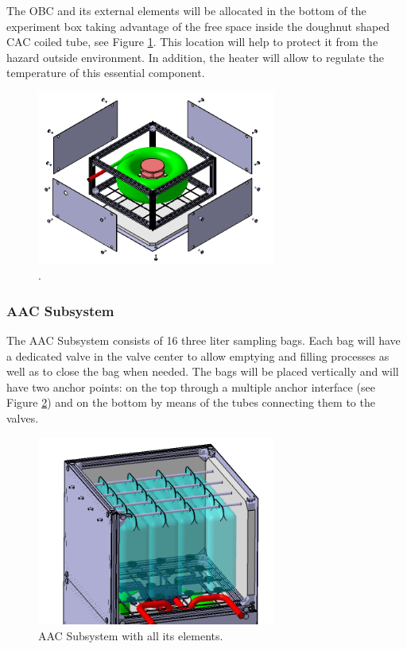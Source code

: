 The OBC and its external elements will be allocated in the bottom of the experiment box taking advantage of the free space inside the doughnut shaped CAC coiled tube, see Figure \ref{electronics_box}. This location will help to protect it from the hazard outside environment. In addition, the heater will allow to regulate the temperature of this essential component.


\begin{figure}[!ht]
    \centering
    \includegraphics[width=0.7\textwidth]{4-experiment-design/img/explos_CAC.jpg}
    \caption{.}
    \label{electronics_box}
\end{figure}

\subsubsection{AAC Subsystem}

The AAC Subsystem consists of 16 three liter sampling bags. Each bag will have a dedicated valve in the valve center to allow emptying and filling processes as well as to close the bag when needed. The bags will be placed vertically and will have two anchor points: on the top through a  multiple anchor interface (see Figure \ref{anchor_bags}) and on the bottom by means of the tubes connecting them to the valves.


\begin{figure}[!ht]
    \centering
    \includegraphics[width=0.7\textwidth]{4-experiment-design/img/anchored_bags.jpg}
    \caption{AAC Subsystem with all its elements.}
    \label{anchor_bags}
\end{figure}


